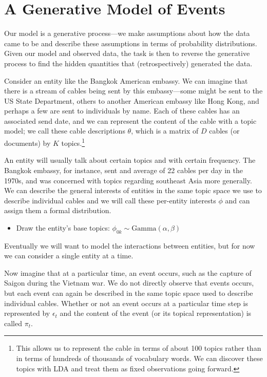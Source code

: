 \section{A Generative Model of Events}
Our model is a generative process---we make assumptions about how the data came to be and describe these assumptions in terms of probability distributions.  Given our model and observed data, the task is then to reverse the generative process to find the hidden quantities that (retrospectively) generated the data.

Consider an entity like the Bangkok American embassy.  We can imagine that there is a stream of cables being sent by this embassy---some might be sent to the US State Department, others to another American embassy like Hong Kong, and perhaps a few are sent to individuals by name.  Each of these cables has an associated send date, and we can represent the content of the cable with a topic model; we call these cable descriptions $\theta$, which is a matrix of $D$ cables (or documents) by $K$ topics.\footnote{This allows us to represent the cable in terms of about 100 topics rather than in terms of hundreds of thousands of vocabulary words. We can discover these topics with LDA and treat them as fixed observations going forward.}

An entity will usually talk about certain topics and with certain frequency. The Bangkok embassy, for instance, sent and average of 22 cables per day in the 1970s, and was concerned with topics regarding southeast Asia more generally.  We can describe the general interests of entities in the same topic space we use to describe individual cables and we will call these per-entity interests $\phi$ and can assign them a formal distribution.
\begin{itemize}
\item Draw the entity's base topics: $\phi_{0k} \sim \mbox{Gamma}(\alpha, \beta)$
\end{itemize}
Eventually we will want to model the interactions between entities, but for now we can consider a single entity at a time.

Now imagine that at a particular time, an event occurs, such as the capture of Saigon during the Vietnam war.  We do not directly observe that events occurs, but each event can again be described in the same topic space used to describe individual cables.  Whether or not an event occurs at a particular time step is represented by $\epsilon_t$ and the content of the event (or its topical representation) is called $\pi_t$.

